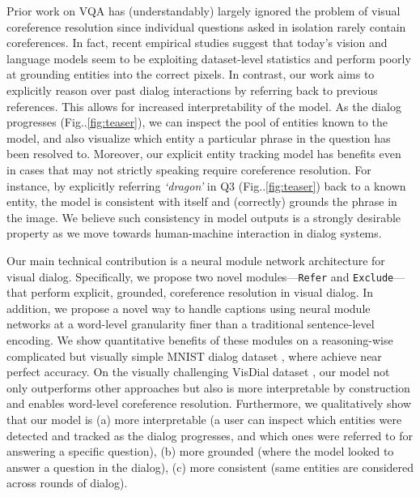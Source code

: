 \documentclass[runningheads]{llncs}
\makeatletter
\DeclareRobustCommand\onedot{\futurelet\@let@token\@onedot}
\def\@onedot{\ifx\@let@token.\else.\null\fi\xspace}
\def\Fig{Fig\onedot}
\makeatother
\begin{document}
Prior work on VQA \cite{malinowski15iccv,fukui16emnlp,anderson18cvpr} has (understandably) largely ignored the problem of visual coreference resolution since individual questions asked in isolation rarely contain coreferences.
In fact, recent empirical studies 
\cite{AgrawalBP16,JohnsonHMFZG16,ZhangGSBP15,goyal17cvpr} suggest that today's 
vision and language models seem to be exploiting dataset-level statistics and 
perform poorly at grounding entities into the correct pixels. 
In contrast, our work aims to explicitly reason over past 
dialog interactions by referring back to previous references.
This allows for increased interpretability of the model.
As the dialog progresses (\Fig\ref{fig:teaser}), we can inspect the pool of
entities known to the model, and also visualize which entity a particular
phrase in the question has been resolved to.
Moreover, our explicit entity tracking model has benefits even in cases that 
may not strictly speaking require coreference resolution.
For instance, by explicitly referring \textit{`dragon'} in Q3 
(\Fig\ref{fig:teaser}) back to a known entity, the model 
is consistent with itself and (correctly) grounds the phrase in the image. 
We believe such consistency in model outputs is a strongly desirable property 
as we move towards human-machine interaction in dialog systems.








Our main technical contribution is a neural module network architecture for 
visual dialog.
Specifically, we propose two novel modules---\texttt{Refer} and 
\texttt{Exclude}---that
perform explicit, grounded, coreference resolution in visual dialog.
In addition, we propose a novel way to handle captions using
neural module networks at a word-level granularity finer than a traditional 
sentence-level encoding.
We show quantitative benefits of these modules on a reasoning-wise 
complicated but visually simple MNIST dialog dataset \cite{paul2017visual}, 
where achieve near perfect accuracy.
On the visually challenging VisDial dataset \cite{visdial}, our model not only
outperforms other approaches but also is more 
interpretable by construction and enables word-level coreference resolution.
Furthermore, we qualitatively show that our model is
(a) more interpretable (a user can inspect which entities were detected and
tracked as the dialog progresses, and which ones were referred to for answering
a specific question),
(b) more grounded (where the model looked to answer a question in the dialog),
(c) more consistent (same entities are considered across rounds of dialog).
\end{document}
